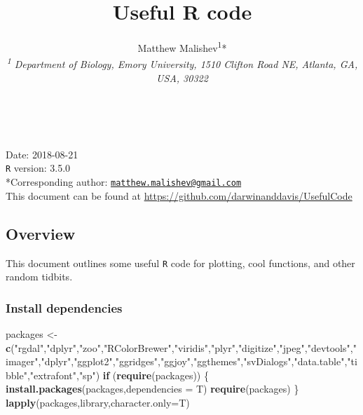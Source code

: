 \documentclass[10,portrait]{article}
\title{Useful R code}
\author{Matthew Malishev\textsuperscript{1}*\\
\emph{\textsuperscript{1} Department of Biology, Emory University, 1510
Clifton Road NE, Atlanta, GA, USA, 30322}}
\date{}
\newenvironment{Shaded}{\begin{snugshade}}{\end{snugshade}}
\newcommand{\KeywordTok}[1]{\textcolor[rgb]{0.13,0.29,0.53}{\textbf{#1}}}
\newcommand{\DataTypeTok}[1]{\textcolor[rgb]{0.13,0.29,0.53}{#1}}
\newcommand{\StringTok}[1]{\textcolor[rgb]{0.31,0.60,0.02}{#1}}
\newcommand{\ControlFlowTok}[1]{\textcolor[rgb]{0.13,0.29,0.53}{\textbf{#1}}}
\newcommand{\NormalTok}[1]{#1}
\begin{document}
\maketitle

{
\hypersetup{linkcolor=black}
\setcounter{tocdepth}{3}
\tableofcontents
}
~

Date: 2018-08-21\\
\texttt{R} version: 3.5.0\\
*Corresponding author:
\href{mailto:matthew.malishev@gmail.com}{\nolinkurl{matthew.malishev@gmail.com}}\\
This document can be found at
\url{https://github.com/darwinanddavis/UsefulCode}

\newpage  

\subsection{Overview}\label{overview}

This document outlines some useful \texttt{R} code for plotting, cool
functions, and other random tidbits.

\subsubsection{Install dependencies}\label{install-dependencies}

\begin{Shaded}
\begin{Highlighting}[]
\NormalTok{packages <-}\StringTok{ }\KeywordTok{c}\NormalTok{(}\StringTok{"rgdal"}\NormalTok{,}\StringTok{"dplyr"}\NormalTok{,}\StringTok{"zoo"}\NormalTok{,}\StringTok{"RColorBrewer"}\NormalTok{,}\StringTok{"viridis"}\NormalTok{,}\StringTok{"plyr"}\NormalTok{,}\StringTok{"digitize"}\NormalTok{,}\StringTok{"jpeg"}\NormalTok{,}\StringTok{"devtools"}\NormalTok{,}\StringTok{"imager"}\NormalTok{,}\StringTok{"dplyr"}\NormalTok{,}\StringTok{"ggplot2"}\NormalTok{,}\StringTok{"ggridges"}\NormalTok{,}\StringTok{"ggjoy"}\NormalTok{,}\StringTok{"ggthemes"}\NormalTok{,}\StringTok{"svDialogs"}\NormalTok{,}\StringTok{"data.table"}\NormalTok{,}\StringTok{"tibble"}\NormalTok{,}\StringTok{"extrafont"}\NormalTok{,}\StringTok{"sp"}\NormalTok{)   }
\ControlFlowTok{if}\NormalTok{ (}\KeywordTok{require}\NormalTok{(packages)) \{}
    \KeywordTok{install.packages}\NormalTok{(packages,}\DataTypeTok{dependencies =}\NormalTok{ T)}
    \KeywordTok{require}\NormalTok{(packages)}
\NormalTok{\}}
\KeywordTok{lapply}\NormalTok{(packages,library,}\DataTypeTok{character.only=}\NormalTok{T)}
\end{Highlighting}
\end{Shaded}
\end{document}
